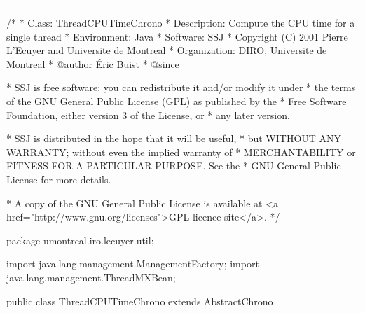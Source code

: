 \bigskip\hrule
\begin{code}
\begin{hide}
/*
 * Class:        ThreadCPUTimeChrono
 * Description:  Compute the CPU time for a single thread
 * Environment:  Java
 * Software:     SSJ 
 * Copyright (C) 2001  Pierre L'Ecuyer and Universite de Montreal
 * Organization: DIRO, Universite de Montreal
 * @author       Éric Buist
 * @since

 * SSJ is free software: you can redistribute it and/or modify it under
 * the terms of the GNU General Public License (GPL) as published by the
 * Free Software Foundation, either version 3 of the License, or
 * any later version.

 * SSJ is distributed in the hope that it will be useful,
 * but WITHOUT ANY WARRANTY; without even the implied warranty of
 * MERCHANTABILITY or FITNESS FOR A PARTICULAR PURPOSE.  See the
 * GNU General Public License for more details.

 * A copy of the GNU General Public License is available at
   <a href="http://www.gnu.org/licenses">GPL licence site</a>.
 */
\end{hide}
package umontreal.iro.lecuyer.util;\begin{hide}

import java.lang.management.ManagementFactory;
import java.lang.management.ThreadMXBean;\end{hide}


public class ThreadCPUTimeChrono extends AbstractChrono\begin{hide} {
   private  long           myThreadId;
   static   ThreadMXBean   threadMXBean = null;

   protected void getTime (long[] tab) {
      long rawTime = getTime();
      final long DIV = 1000000000L;
      long seconds = rawTime/DIV;
      long micros = (rawTime %
      tab[0] = seconds;
      tab[1] = micros;
   }

   protected long getTime() {
      if (threadMXBean == null) {
         // We use lazy initialization to avoid a potential exception being wrapped into a confusing
         // ExceptionInInitializerError. That would happen if this initialization was in a static block instead of
         // in this method.
         threadMXBean = ManagementFactory.getThreadMXBean();
         if (!threadMXBean.isThreadCpuTimeEnabled())
            // Call this only when necessary, because this can throw a SecurityException if
            // run under a security manager.
            threadMXBean.setThreadCpuTimeEnabled (true);
      }
      long time = threadMXBean.getThreadCpuTime(myThreadId);
      return time < 0 ? 0 : time;
   }\end{hide}
\end{code}

